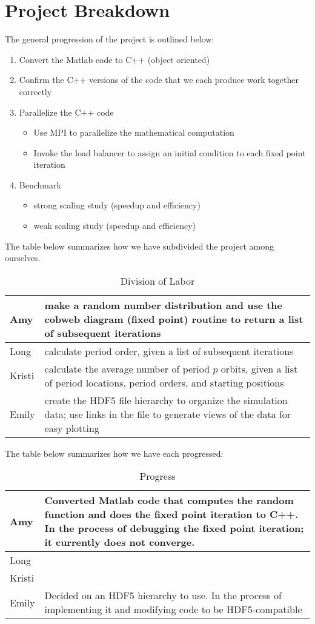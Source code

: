 \documentclass[12pt]{article}
\newcommand{\be}{\begin{enumerate}}
\newcommand{\ee}{\end{enumerate}}
\newcommand{\bi}{\begin{itemize}}
\newcommand{\ei}{\end{itemize}}
\begin{document}
\section{Project Breakdown}
The general progression of the project is outlined below:
\be
\item Convert the Matlab code to C++ (object oriented)
\item Confirm the C++ versions of the code that we each produce work
  together correctly
\item Parallelize the C++ code
\bi
\item Use MPI to parallelize the mathematical computation
\item Invoke the load balancer to assign an initial condition to each
  fixed point iteration \cite{dlb}
\ei
\item Benchmark 
\bi
\item strong scaling study (speedup and efficiency)
\item weak scaling study (speedup and efficiency)
\ei
\ee
\noindent The table below summarizes how we have subdivided the project among
ourselves. 
\begin {table}[H]
\centering
\caption{Division of Labor}
    \begin{tabular}{ |p{1cm}|p{10cm}|} 
    \hline
    Amy &  make a random number distribution and use the cobweb
    diagram (fixed point) routine to return a list of subsequent iterations\\ \hline
    Long & calculate period order, given a list of subsequent iterations  \\ \hline
    Kristi & calculate the average number of period $p$ orbits, given
    a list of period locations, period orders, and starting positions\\ \hline
    Emily  & create the HDF5 file hierarchy to organize the simulation
    data; use links in the file to generate views of the data for easy
    plotting\\ \hline
    \end{tabular}
\end{table}
\newpage
\noindent The table below summarizes how we have each progressed:
\begin {table}[H]
\centering
\caption{Progress}
    \begin{tabular}{ |p{1cm}|p{10cm}|} 
    \hline
    Amy &  Converted Matlab code that computes the random function and
    does the fixed point iteration to C++. In the process of debugging
    the fixed point iteration; it currently does not converge. \\ \hline
    Long & \\ \hline
    Kristi & \\ \hline
    Emily  & Decided on an HDF5 hierarchy to use. In the process of
    implementing it and modifying code to be HDF5-compatible\\ \hline
    \end{tabular}
\end{table}
\end{document}
